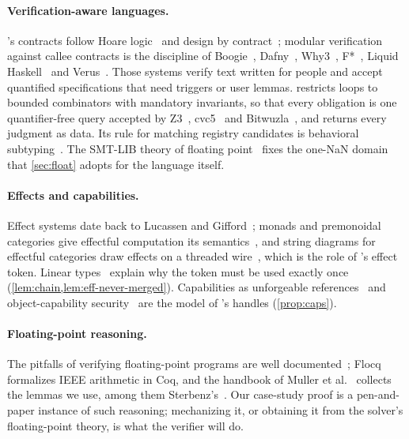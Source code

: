 \paragraph{Verification-aware languages.}
\VG's contracts follow Hoare logic~\cite{hoare1969,floyd1967} and design by
contract~\cite{meyer1992}; modular verification against callee contracts is the discipline of
Boogie~\cite{barnett2005boogie}, Dafny~\cite{leino2010dafny}, Why3~\cite{filliatre2013why3},
F*~\cite{swamy2016fstar}, Liquid Haskell~\cite{vazou2014refinement} and
Verus~\cite{lattuada2023verus}. Those systems verify text written for people and accept
quantified specifications that need triggers or user lemmas. \VG{} restricts loops to bounded
combinators with mandatory invariants, so that every obligation is one quantifier-free query
accepted by Z3~\cite{demoura2008z3}, cvc5~\cite{barbosa2022cvc5} and
Bitwuzla~\cite{niemetz2023bitwuzla}, and returns every judgment as data. Its rule for matching
registry candidates is behavioral subtyping~\cite{liskov1994behavioral}. The SMT-LIB theory of
floating point~\cite{brain2015fp,smtlib} fixes the one-NaN domain that \cref{sec:float} adopts
for the language itself.

\paragraph{Effects and capabilities.}
Effect systems date back to Lucassen and Gifford~\cite{lucassen1988polymorphic}; monads and
premonoidal categories give effectful computation its semantics~\cite{moggi1991notions,
power1997premonoidal}, and string diagrams for effectful categories draw effects on a threaded
wire~\cite{roman2022promonads}, which is the role of \VG's effect token. Linear
types~\cite{wadler1990linear} explain why the token must be used exactly once
(\cref{lem:chain,lem:eff-never-merged}). Capabilities as unforgeable
references~\cite{dennis1966programming} and object-capability
security~\cite{miller2006robust} are the model of \VG's handles (\cref{prop:caps}).

\paragraph{Floating-point reasoning.}
The pitfalls of verifying floating-point programs are well documented~\cite{goldberg1991,
monniaux2008pitfalls}; Flocq~\cite{boldo2011flocq} formalizes IEEE arithmetic in Coq, and the
handbook of Muller et al.~\cite{muller2018handbook} collects the lemmas we use, among them
Sterbenz's~\cite{sterbenz1974}. Our case-study proof is a pen-and-paper instance of such
reasoning; mechanizing it, or obtaining it from the solver's floating-point theory, is what the
verifier will do.

